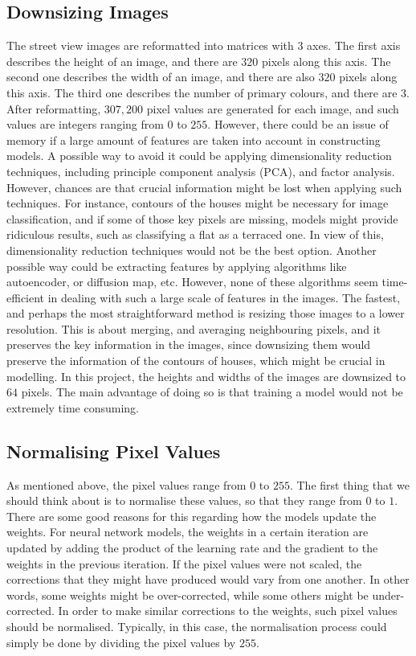 \documentclass[11pt,twoside]{article}
\numberwithin{Theorem}{section}
\numberwithin{Definition}{section}
\numberwithin{Lemma}{section}
\numberwithin{Algorithm}{section}
\numberwithin{equation}{section}
\begin{document}
\subsection{Downsizing Images}
The street view images are reformatted into matrices with $3$ axes. The first axis describes the height of an image, and there are $320$ pixels along this axis. The second one describes the width of an image, and there are also $320$ pixels along this axis. The third one describes the number of primary colours, and there are $3$. After reformatting, $307, 200$ pixel values are generated for each image, and such values are integers ranging from $0$ to $255$. However, there could be an issue of memory if a large amount of features are taken into account in constructing models. A possible way to avoid it could be applying dimensionality reduction techniques, including principle component analysis (PCA), and factor analysis. However, chances are that crucial information might be lost when applying such techniques. For instance, contours of the houses might be necessary for image classification, and if some of those key pixels are missing, models might provide ridiculous results, such as classifying a flat as a terraced one. In view of this, dimensionality reduction techniques would not be the best option. Another possible way could be extracting features by applying algorithms like autoencoder, or diffusion map, etc. However, none of these algorithms seem time-efficient in dealing with such a large scale of features in the images. The fastest, and perhaps the most straightforward method is resizing those images to a lower resolution. This is about merging, and averaging neighbouring pixels, and it preserves the key information in the images, since downsizing them would preserve the information of the contours of houses, which might be crucial in modelling. In this project, the heights and widths of the images are downsized to $64$ pixels. The main advantage of doing so is that training a model would not be extremely time consuming.

\subsection{Normalising Pixel Values}
As mentioned above, the pixel values range from $0$ to $255$. The first thing that we should think about is to normalise these values, so that they range from $0$ to $1$. There are some good reasons for this regarding how the models update the weights. For neural network models, the weights in a certain iteration are updated by adding the product of the learning rate and the gradient to the weights in the previous iteration. If the pixel values were not scaled, the corrections that they might have produced would vary from one another. In other words, some weights might be over-corrected, while some others might be under-corrected. In order to make similar corrections to the weights, such pixel values should be normalised. Typically, in this case, the normalisation process could simply be done by dividing the pixel values by $255$.
\end{document}
